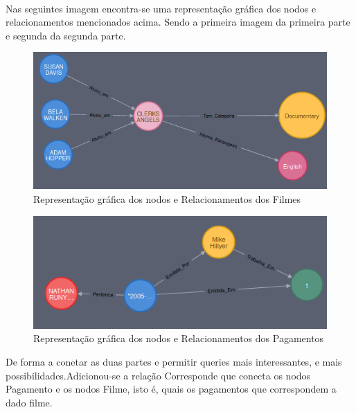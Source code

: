 \hfill\\
Nas seguintes imagem encontra-se uma representação gráfica dos nodos e relacionamentos mencionados acima. Sendo a primeira imagem da primeira parte e segunda  da segunda parte.\newline
\hfill\\
\begin{figure}[H]

  \centering

  \includegraphics[width=\textwidth]{Movie.png}

  \caption {Representação gráfica dos nodos e Relacionamentos dos Filmes}

  \label {fig:Filme}

\end{figure}


\begin{figure}[H]

  \centering

  \includegraphics[width=\textwidth]{Pagamento.png}

  \caption {Representação gráfica dos nodos e Relacionamentos dos Pagamentos}

  \label {fig:Pagamento}

\end{figure}

De forma a conetar as duas partes e permitir queries mais interessantes, e mais possibilidades.Adicionou-se a relação Corresponde que conecta os nodos Pagamento e os nodos Filme, isto é, quais os pagamentos que correspondem a dado filme.

